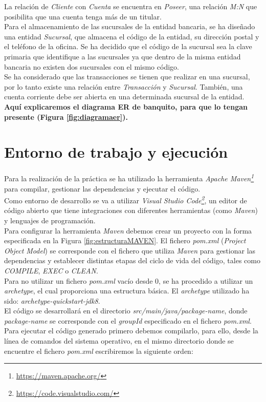 \documentclass[11pt,a4paper]{article}
\begin{document}
La relación de \emph{Cliente} con \emph{Cuenta} se encuentra en \emph{Poseer}, una relación \emph{M:N} que posibilita que una cuenta tenga más de un titular.\\
Para el almacenamiento de las sucursales de la entidad bancaria, se ha diseñado una entidad \emph{Sucursal}, que almacena el código de la entidad, su dirección postal y el teléfono de la oficina. Se ha decidido que el código de la sucursal sea la clave primaria que identifique a las sucursales ya que dentro de la misma entidad bancaria no existen dos sucursales con el mismo código.\\
Se ha considerado que las transacciones se tienen que realizar en una sucursal, por lo tanto existe una relación entre \emph{Transacción} y \emph{Sucursal}. También, una cuenta corriente debe ser abierta en una determinada sucursal de la entidad.\\

\textbf{Aquí explicaremos el diagrama ER de banquito, para que lo tengan presente (Figura \ref{fig:diagramaer}).}

\section{Entorno de trabajo y ejecución}

Para la realización de la práctica se ha utilizado la herramienta \emph{Apache Maven\footnote{\url{https://maven.apache.org/}}} para compilar, gestionar las dependencias y ejecutar el código.\\
Como entorno de desarrollo se va a utilizar \emph{Visual Studio Code\footnote{\url{https://code.visualstudio.com/}}}, un editor de código abierto que tiene integraciones con diferentes herramientas (como \emph{Maven}) y lenguajes de programación.\\

Para configurar la herramienta \emph{Maven} debemos crear un proyecto con la forma especificada en la Figura \ref{fig:estructuraMAVEN}. El fichero \emph{pom.xml} (\emph{Project Object Model}) se corresponde con el fichero que utiliza \emph{Maven} para gestionar las dependencias y establecer distintas etapas del ciclo de vida del código, tales como \emph{COMPILE}, \emph{EXEC} o \emph{CLEAN}.\\
Para no utilizar un fichero \emph{pom.xml} vacío desde 0, se ha procedido a utilizar un \emph{archetype}, el cual proporciona una estructura básica. El \emph{archetype} utilizado ha sido: \emph{archetype-quickstart-jdk8}.\\
El código se desarrollará en el directorio \emph{src/main/java/package-name}, donde \emph{package-name} se corresponde con el \emph{groupId} especificado en el fichero \emph{pom.xml}.\\
Para ejecutar el código generado primero debemos compilarlo, para ello, desde la línea de comandos del sistema operativo, en el mismo directorio donde se encuentre el fichero \emph{pom.xml} escribiremos la siguiente orden:
\end{document}

